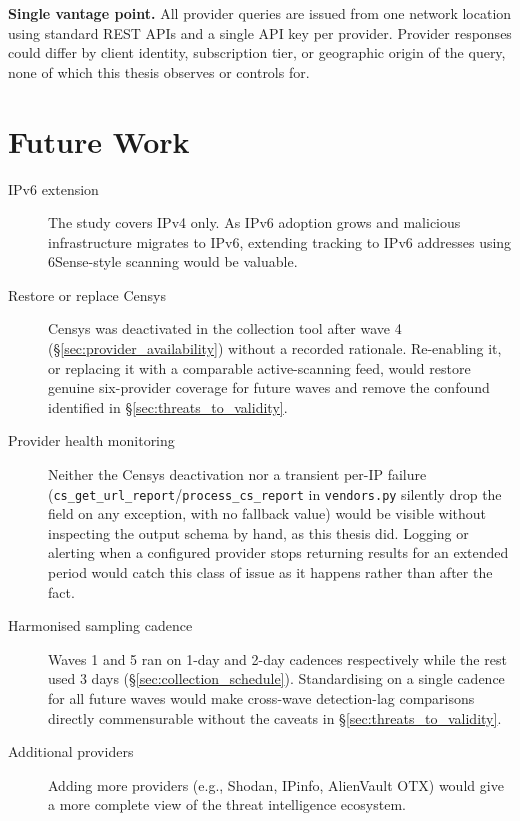 \documentclass[12pt, a4paper, twoside]{report}
\begin{document}
\textbf{Single vantage point.} All provider queries are issued from one network location using
standard REST APIs and a single API key per provider. Provider responses could differ by client
identity, subscription tier, or geographic origin of the query, none of which this thesis observes
or controls for.

\chapter{Future Work}
\label{ch:future_work}

\begin{description}
  \item[IPv6 extension] The study covers IPv4 only. As IPv6 adoption grows and malicious
    infrastructure migrates to IPv6, extending tracking to IPv6 addresses using 6Sense-style
    scanning \cite{williams2024sixsense} would be valuable.
  \item[Restore or replace Censys] Censys was deactivated in the collection tool after wave 4
    (\S\ref{sec:provider_availability}) without a recorded rationale. Re-enabling it, or replacing
    it with a comparable active-scanning feed, would restore genuine six-provider coverage for
    future waves and remove the confound identified in \S\ref{sec:threats_to_validity}.
  \item[Provider health monitoring] Neither the Censys deactivation nor a transient per-IP failure
    (\texttt{cs\_get\_url\_report}/\texttt{process\_cs\_report} in \texttt{vendors.py} silently
    drop the field on any exception, with no fallback value) would be visible without inspecting
    the output schema by hand, as this thesis did. Logging or alerting when a configured provider
    stops returning results for an extended period would catch this class of issue as it happens
    rather than after the fact.
  \item[Harmonised sampling cadence] Waves 1 and 5 ran on 1-day and 2-day cadences respectively
    while the rest used 3 days (\S\ref{sec:collection_schedule}). Standardising on a single cadence
    for all future waves would make cross-wave detection-lag comparisons directly commensurable
    without the caveats in \S\ref{sec:threats_to_validity}.
  \item[Additional providers] Adding more providers (e.g., Shodan, IPinfo, AlienVault OTX) would
    give a more complete view of the threat intelligence ecosystem.

\end{description}
\end{document}
